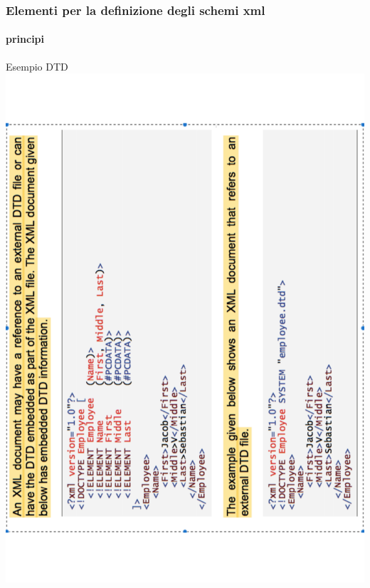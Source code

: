 
\begin{frame}
    \frametitle{Elementi per la definizione degli schemi xml}
    \framesubtitle{principi}
    \addtocounter{nframe}{1}

    \begin{block}{Esempio DTD}
        \includegraphics[width=.5\textwidth]{../imgs/dtd_1.pdf}
    \end{block}

\end{frame}